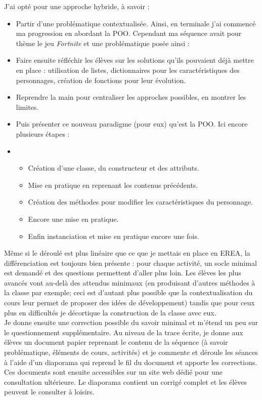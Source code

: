 \documentclass[a4paper,11pt]{article}
\begin{document}
J'ai opté pour une approche hybride, à savoir :
\begin{itemize}
    \item Partir d'une problématique contextualisée. Ainsi, en terminale j'ai commencé ma progression en abordant la POO. Cependant ma séquence avait pour thème le jeu \emph{Fortnite} et une problématique posée ainsi : 
    \item Faire ensuite réfléchir les élèves sur les solutions qu'ils pouvaient déjà mettre en place : utilisation de listes, dictionnaires pour les caractéristiques des personnages, création de fonctions pour leur évolution.
    \item Reprendre la main pour centraliser les approches possibles, en montrer les limites.
    \item Puis présenter ce nouveau paradigme (pour eux) qu'est la POO. Ici encore plusieurs étapes :
    \item \begin{itemize}
        \item Création d'une classe, du constructeur et des attributs.
        \item Mise en pratique en reprenant les contenus précédents.
        \item Création des méthodes pour modifier les caractéristiques du personnage.
        \item Encore une mise en pratique.
        \item Enfin instanciation et mise en pratique encore une fois.
    \end{itemize}
\end{itemize}
Même si le déroulé est plus linéaire que ce que je mettais en place en EREA, la différenciation est toujours bien présente : pour chaque activité, un socle minimal est demandé et des questions permettent d'aller plus loin. Les élèves les plus avancés vont au-delà des attendus minimaux (en produisant d'autres méthodes à la classe par exemple; ceci est d'autant plus possible que la contextualisation du cours leur permet de proposer des idées de développement) tandis que pour ceux plus en difficultés je décortique la construction de la classe avec eux.\\
Je donne ensuite une correction possible du savoir minimal et m'étend un peu sur le questionnement supplémentaire. Au niveau de la trace écrite, je donne aux élèves un document papier reprenant le contenu de la séquence (à savoir problématique, éléments de cours, activités) et je commente et déroule les séances à l'aide d'un diaporama qui reprend le fil du document et apporte les corrections. Ces documents sont ensuite accessibles sur un site web dédié pour une consultation ultérieure. Le diaporama contient un corrigé complet et les élèves peuvent le consulter à loisirs.\\
\end{document}
